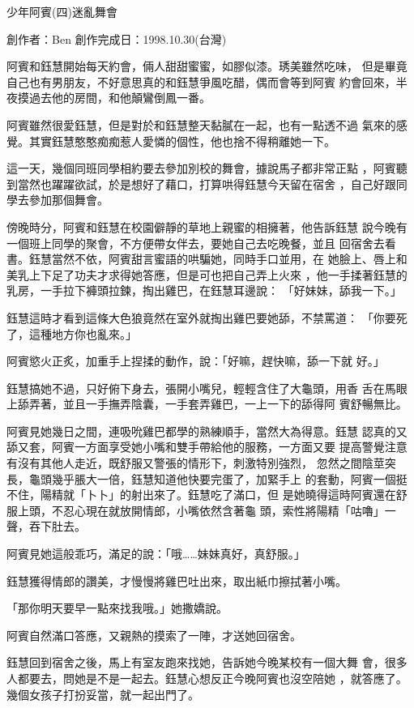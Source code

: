 



少年阿賓(四)迷亂舞會

創作者：Ben
創作完成日：1998.10.30(台灣)


阿賓和鈺慧開始每天約會，倆人甜甜蜜蜜，如膠似漆。琇美雖然吃味，
但是畢竟自己也有男朋友，不好意思真的和鈺慧爭風吃醋，偶而會等到阿賓
約會回來，半夜摸過去他的房間，和他顛鸞倒鳳一番。

阿賓雖然很愛鈺慧，但是對於和鈺慧整天黏膩在一起，也有一點透不過
氣來的感覺。其實鈺慧憨憨痴痴惹人愛憐的個性，他也捨不得稍離她一下。

這一天，幾個同班同學相約要去參加別校的舞會，據說馬子都非常正點
，阿賓聽到當然也躍躍欲試，於是想好了藉口，打算哄得鈺慧今天留在宿舍
，自己好跟同學去參加那個舞會。

傍晚時分，阿賓和鈺慧在校園僻靜的草地上親蜜的相擁著，他告訴鈺慧
說今晚有一個班上同學的聚會，不方便帶女伴去，要她自己去吃晚餐，並且
回宿舍去看書。鈺慧當然不依，阿賓甜言蜜語的哄騙她，同時手口並用，在
她臉上、唇上和美乳上下足了功夫才求得她答應，但是可也把自己弄上火來
，他一手揉著鈺慧的乳房，一手拉下褲頭拉鍊，掏出雞巴，在鈺慧耳邊說：
「好妹妹，舔我一下。」

鈺慧這時才看到這條大色狼竟然在室外就掏出雞巴要她舔，不禁罵道：
「你要死了，這種地方你也亂來。」

阿賓慾火正炙，加重手上捏揉的動作，說：「好嘛，趕快嘛，舔一下就
好。」

鈺慧搞她不過，只好俯下身去，張開小嘴兒，輕輕含住了大龜頭，用香
舌在馬眼上舔弄著，並且一手撫弄陰囊，一手套弄雞巴，一上一下的舔得阿
賓舒暢無比。

阿賓見她幾日之間，連吸吮雞巴都學的熟練順手，當然大為得意。鈺慧
認真的又舔又套，阿賓一方面享受她小嘴和雙手帶給他的服務，一方面又要
提高警覺注意有沒有其他人走近，既舒服又警張的情形下，刺激特別強烈，
忽然之間陰莖突長，龜頭幾乎脹大一倍，鈺慧知道他快要完蛋了，加緊手上
的套動，阿賓一個挺不住，陽精就「卜卜」的射出來了。鈺慧吃了滿口，但
是她曉得這時阿賓還在舒服上頭，不忍心現在就放開情郎，小嘴依然含著龜
頭，索性將陽精「咕嚕」一聲，吞下肚去。

阿賓見她這般乖巧，滿足的說：「哦……妹妹真好，真舒服。」

鈺慧獲得情郎的讚美，才慢慢將雞巴吐出來，取出紙巾擦拭著小嘴。

「那你明天要早一點來找我哦。」她撒嬌說。

阿賓自然滿口答應，又親熱的摸索了一陣，才送她回宿舍。

鈺慧回到宿舍之後，馬上有室友跑來找她，告訴她今晚某校有一個大舞
會，很多人都要去，問她是不是一起去。鈺慧心想反正今晚阿賓也沒空陪她
，就答應了。幾個女孩子打扮妥當，就一起出門了。

